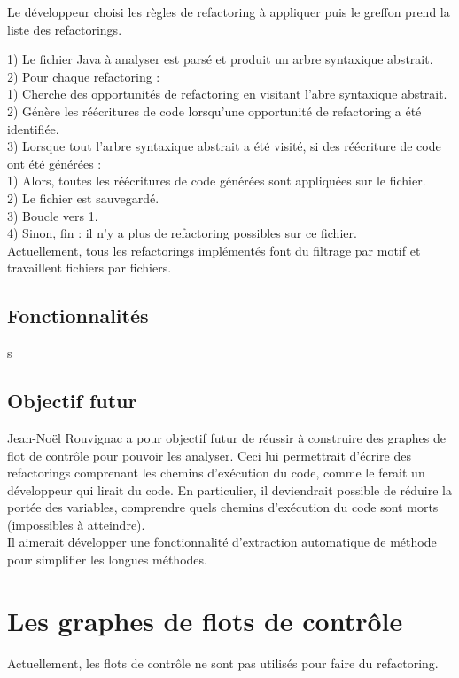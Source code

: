 \documentclass[a4paper,twoside,12pt,openright]{report}
\begin{document}
Le développeur choisi les règles de refactoring à appliquer puis le greffon prend la liste des refactorings.

1) Le fichier Java à analyser est parsé et produit un arbre syntaxique abstrait.\\

2) Pour chaque refactoring :\\
\tabto{0.8cm} 1) Cherche des opportunités de refactoring en visitant l'abre syntaxique abstrait.\\
\tabto{0.8cm} 2) Génère les réécritures de code lorsqu'une  opportunité de refactoring a été identifiée.\\

3) Lorsque tout l'arbre syntaxique abstrait a été visité, si des réécriture de code ont été générées :\\
\tabto{0.8cm} 1) Alors, toutes les réécritures de code générées sont appliquées sur le fichier.\\
\tabto{0.8cm} 2) Le fichier est sauvegardé.\\
\tabto{0.8cm} 3) Boucle vers 1.\\
\tabto{0.8cm} 4) Sinon, fin : il n'y a plus de refactoring possibles sur ce fichier.\\

Actuellement, tous les refactorings implémentés font du filtrage par motif et travaillent fichiers par fichiers.
\subsection{Fonctionnalités}
s

\subsection{Objectif futur}
Jean-Noël Rouvignac a pour objectif futur de réussir à construire des graphes de flot de contrôle pour pouvoir les analyser. Ceci lui permettrait d'écrire des refactorings comprenant les chemins d'exécution du code, comme le ferait un développeur qui lirait du code. En particulier, il deviendrait possible de réduire la portée des variables, comprendre quels chemins d'exécution du code sont morts (impossibles à atteindre).\cite{ref7}\\
Il aimerait développer une fonctionnalité d'extraction automatique de méthode pour simplifier les longues méthodes.



\section{Les graphes de flots de contrôle}
Actuellement, les flots de contrôle ne sont pas utilisés pour faire du refactoring.







\end{document}
